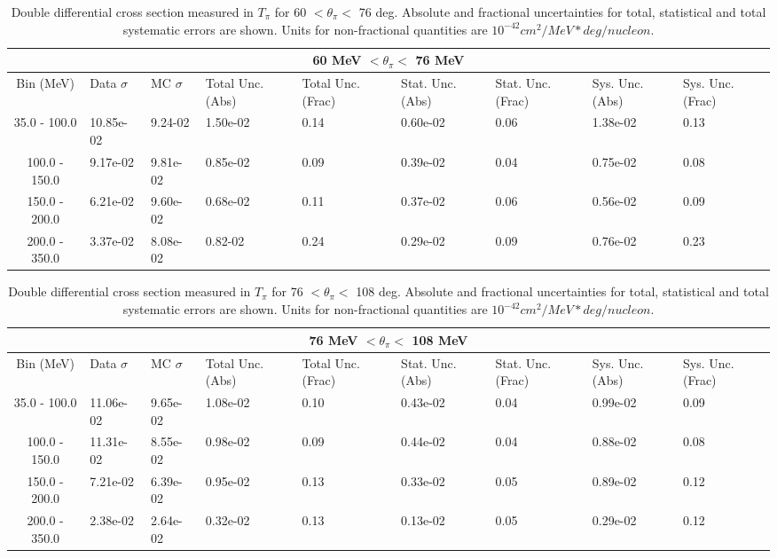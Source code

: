 \begin{table}[!htb]
    \centering
    \tiny
    \begin{tabular}{|c|p{0.5in}|p{0.5in}|p{0.5in}|p{0.5in}|p{0.5in}|p{0.5in}|p{0.5in}|p{0.5in}|}

        \hline
        \multicolumn{9}{c}{60 MeV $ < \theta_\pi < $ 76 MeV}\\
        \hline
        Bin (MeV)& Data $\sigma$ & MC $\sigma$ & Total Unc. (Abs) & Total Unc. (Frac)  & Stat. Unc. (Abs) & Stat. Unc. (Frac) & Sys. Unc. (Abs) & Sys. Unc. (Frac)\\ \hline
35.0 - 100.0 & 10.85e-02 & 9.24-02 & 1.50e-02 & 0.14 & 0.60e-02 & 0.06 & 1.38e-02 & 0.13\\ \hline
100.0 - 150.0 & 9.17e-02 & 9.81e-02 & 0.85e-02 & 0.09 & 0.39e-02 & 0.04 & 0.75e-02 & 0.08\\ \hline
150.0 - 200.0 & 6.21e-02 & 9.60e-02 & 0.68e-02 & 0.11 & 0.37e-02 & 0.06 & 0.56e-02 & 0.09\\ \hline
200.0 - 350.0 & 3.37e-02 & 8.08e-02 & 0.82-02 & 0.24 & 0.29e-02 & 0.09 & 0.76e-02 & 0.23\\ \hline

    \end{tabular}
    \caption{Double differential cross section measured in $T_\pi$ for 60 $ < \theta_\pi < $ 76 deg. Absolute and fractional uncertainties for total, statistical and total systematic errors are shown. Units for non-fractional quantities are $10^{-42}cm^2/MeV*deg/nucleon$.}
    \label{tab:ApdxA:XSecTable2Dtpithetapi5}
\end{table}
\begin{table}[!htb]
    \centering
    \tiny
    \begin{tabular}{|c|p{0.5in}|p{0.5in}|p{0.5in}|p{0.5in}|p{0.5in}|p{0.5in}|p{0.5in}|p{0.5in}|}

        \hline
        \multicolumn{9}{c}{76 MeV $ < \theta_\pi < $ 108 MeV}\\
        \hline
        Bin (MeV)& Data $\sigma$ & MC $\sigma$ & Total Unc. (Abs) & Total Unc. (Frac)  & Stat. Unc. (Abs) & Stat. Unc. (Frac) & Sys. Unc. (Abs) & Sys. Unc. (Frac)\\ \hline
35.0 - 100.0 & 11.06e-02 & 9.65e-02 & 1.08e-02 & 0.10 & 0.43e-02 & 0.04 & 0.99e-02 & 0.09\\ \hline
100.0 - 150.0 & 11.31e-02 & 8.55e-02 & 0.98e-02 & 0.09 & 0.44e-02 & 0.04 & 0.88e-02 & 0.08\\ \hline
150.0 - 200.0 & 7.21e-02 & 6.39e-02 & 0.95e-02 & 0.13 & 0.33e-02 & 0.05 & 0.89e-02 & 0.12\\ \hline
200.0 - 350.0 & 2.38e-02 & 2.64e-02 & 0.32e-02 & 0.13 & 0.13e-02 & 0.05 & 0.29e-02 & 0.12\\ \hline


    \end{tabular}
    \caption{Double differential cross section measured in $T_\pi$ for 76 $ < \theta_\pi < $ 108 deg. Absolute and fractional uncertainties for total, statistical and total systematic errors are shown. Units for non-fractional quantities are $10^{-42}cm^2/MeV*deg/nucleon$.}
    \label{tab:ApdxA:XSecTable2Dtpithetapi6}
\end{table}
